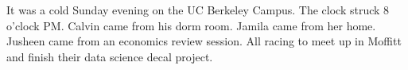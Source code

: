 \documentclass{article}
\begin{document}
It was a cold Sunday evening on the UC Berkeley Campus. The clock struck 8 o'clock PM. Calvin came from his dorm room. Jamila came from her home. Jusheen came from an economics review session. All racing to meet up in Moffitt and finish their data science decal project.
\end{document}
